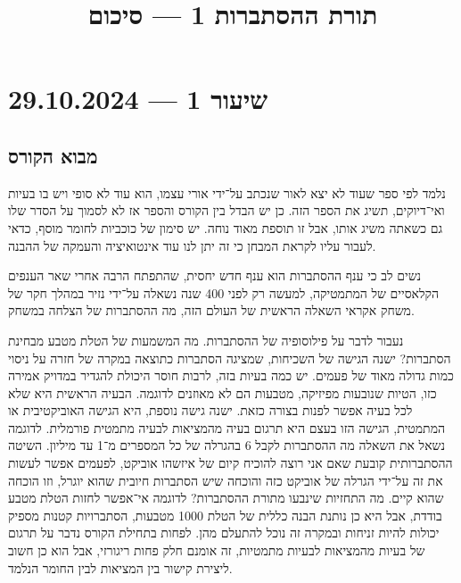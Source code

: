 
\title{תורת ההסתברות 1 --- סיכום}
\setcounter{secnumdepth}{2}

\usepackage{fancyhdr}
\pagestyle{fancy}
\renewcommand{\headrulewidth}{0pt}


\maketitle
\maketitleprint{}

\tableofcontents

\section{שיעור 1 --- 29.10.2024}

\subsection{מבוא הקורס}
נלמד לפי ספר שעוד לא יצא לאור שנכתב על־ידי אורי עצמו, הוא עוד לא סופי ויש בו בעיות ואי־דיוקים, תשיג את הספר הזה.
כן יש הבדל בין הקורס והספר אז לא לסמוך על הסדר שלו גם כשאתה משיג אותו, אבל זו תוספת מאוד נוחה.
יש סימון של כוכביות לחומר מוסף, כדאי לעבור עליו לקראת המבחן כי זה יתן לנו עוד אינטואיציה והעמקה של ההבנה.

נשים לב כי ענף ההסתברות הוא ענף חדש יחסית, שהתפתח הרבה אחרי שאר הענפים הקלאסיים של המתמטיקה, למעשה רק לפני 400 שנה נשאלה על־ידי נזיר במהלך חקר של משחק אקראי השאלה הראשית של העולם הזה, מה ההסתברות של הצלחה במשחק.

נעבור לדבר על פילוסופיה של ההסתברות.
מה המשמעות של הטלת מטבע מבחינת הסתברות?
ישנה הגישה של השכיחות, שמציגה הסתברות כתוצאה במקרה של חזרה על ניסוי כמות גדולה מאוד של פעמים.
יש כמה בעיות בזה, לרבות חוסר היכולת להגדיר במדויק אמירה כזו, הטיות שנובעות מפיזיקה, מטבעות הם לא מאוזנים לדוגמה.
הבעיה הראשית היא שלא לכל בעיה אפשר לפנות בצורה כזאת.
ישנה גישה נוספת, היא הגישה האוביקטיבית או המתמטית, הגישה הזו בעצם היא תרגום בעיה מהמציאות לבעיה מתמטית פורמלית.
לדוגמה נשאל את השאלה מה ההסתברות לקבל 6 בהגרלה של כל המספרים מ־1 עד מיליון.
השיטה ההסתברותית קובעת שאם אני רוצה להוכיח קיום של איזשהו אוביקט, לפעמים אפשר לעשות את זה על־ידי הגרלה של אוביקט כזה והוכחה שיש הסתברות חיובית שהוא יוגרל, וזו הוכחה שהוא קיים.
מה התחזיות שינבעו מתורת ההסתברות? לדוגמה אי־אפשר לחזות הטלת מטבע בודדת, אבל היא כן נותנת הבנה כללית של הטלת 1000 מטבעות, הסתברויות קטנות מספיק יכולות להיות זניחות ובמקרה זה נוכל להתעלם מהן.
לפחות בתחילת הקורס נדבר על תרגום של בעיות מהמציאות לבעיות מתמטיות, זה אומנם חלק פחות ריגורזי, אבל הוא כן חשוב ליצירת קישור בין המציאות לבין החומר הנלמד.

